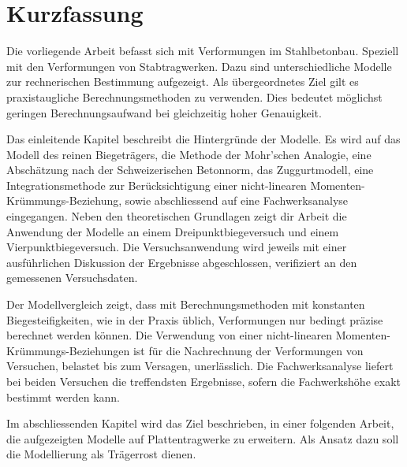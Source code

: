 \chapter*{Kurzfassung}

Die vorliegende Arbeit befasst sich mit Verformungen im Stahlbetonbau. Speziell mit den Verformungen von Stabtragwerken. Dazu sind unterschiedliche Modelle zur rechnerischen Bestimmung aufgezeigt. Als übergeordnetes Ziel gilt es praxistaugliche Berechnungsmethoden zu verwenden. Dies bedeutet möglichst geringen Berechnungsaufwand bei gleichzeitig hoher Genauigkeit.  

Das einleitende Kapitel beschreibt die Hintergründe der Modelle. Es wird auf das Modell des reinen Biegeträgers, die Methode der Mohr'schen Analogie, eine Abschätzung nach der Schweizerischen Betonnorm, das Zuggurtmodell, eine Integrationsmethode zur Berücksichtigung einer nicht-linearen Momenten-Krümmungs-Beziehung, sowie abschliessend auf eine Fachwerksanalyse eingegangen. Neben den theoretischen Grundlagen zeigt dir Arbeit die Anwendung der Modelle an einem Dreipunktbiegeversuch und einem Vierpunktbiegeversuch. Die Versuchsanwendung wird jeweils mit einer ausführlichen Diskussion der Ergebnisse abgeschlossen, verifiziert an den gemessenen Versuchsdaten. 

Der Modellvergleich zeigt, dass mit Berechnungsmethoden mit konstanten Biegesteifigkeiten, wie in der Praxis üblich, Verformungen nur bedingt präzise berechnet werden können. Die Verwendung von einer nicht-linearen Momenten-Krümmungs-Beziehungen ist für die Nachrechnung der Verformungen von Versuchen, belastet bis zum Versagen, unerlässlich. Die Fachwerksanalyse liefert bei beiden Versuchen die treffendsten Ergebnisse, sofern die Fachwerkshöhe exakt bestimmt werden kann. 


Im abschliessenden Kapitel wird das Ziel beschrieben, in einer folgenden Arbeit, die aufgezeigten Modelle auf Plattentragwerke zu erweitern. Als Ansatz dazu soll die Modellierung als Trägerrost dienen.